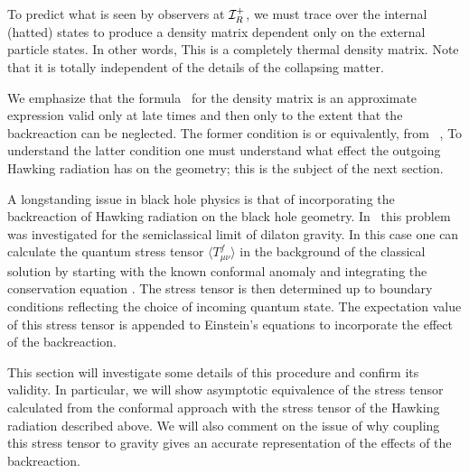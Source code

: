To predict what is seen by observers at ${\cal I}_R^+$, we must trace over
the internal (hatted) states to produce a density matrix dependent only on
the external
particle states. In other words,
%
\eqn{}
%
This is a completely thermal density matrix.  Note that it is totally
independent of the details of the collapsing matter.

We emphasize that the formula \weig\ for the density matrix is an
approximate expression valid only at late times and then only to the extent
that the backreaction can be neglected.  The former condition is
%
\eqn{}
%
or equivalently, from \coordx\ ,
%
\eqn{}
%
To understand the latter condition one must understand what effect the
outgoing Hawking radiation has on the geometry; this is the subject of the
next section.


A longstanding issue in black hole physics is that of incorporating the
backreaction of Hawking radiation on the black hole geometry.  In \CGHS\
this problem was investigated for the semiclassical limit
of dilaton gravity.  In this case one can
calculate the quantum stress tensor $\langle T^{f}_{\mu\nu}\rangle$ in the
background of the
classical solution by starting with the known conformal anomaly and
integrating the conservation equation \refs{\CrFu}. The stress tensor is then
determined
up to boundary conditions
reflecting the choice of incoming quantum state. The expectation value of
this stress tensor is appended to Einstein's equations to incorporate
the effect of the backreaction.

This section will investigate some details of this procedure and confirm
its validity.  In particular, we will show asymptotic
equivalence of the stress tensor
calculated from the conformal approach with the stress tensor of the
Hawking radiation described above.  We will also comment on the issue of
why coupling this stress tensor to gravity gives an accurate representation
of the effects of the backreaction.

